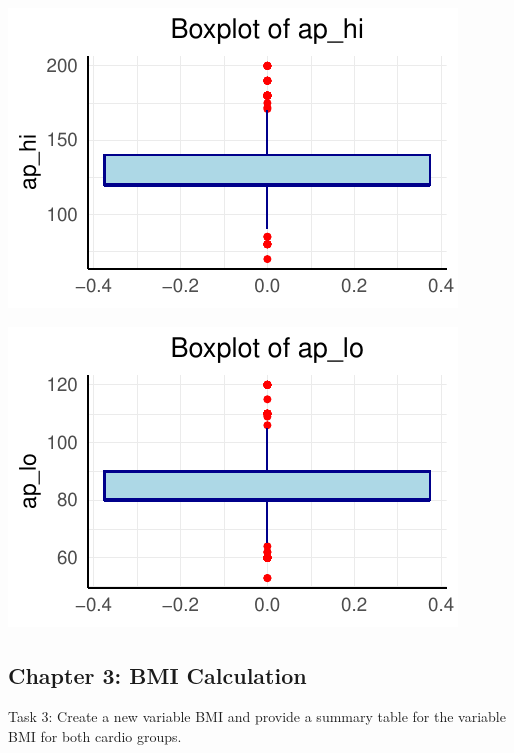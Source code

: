 \documentclass[
  letterpaper,
  DIV=11,
  numbers=noendperiod]{scrartcl}
\begin{document}
\begin{center}
\includegraphics{home_work_test_files/figure-pdf/unnamed-chunk-6-4.pdf}
\end{center}

\begin{center}
\includegraphics{home_work_test_files/figure-pdf/unnamed-chunk-6-5.pdf}
\end{center}

\newpage

\subsection{Chapter 3: BMI Calculation}\label{chapter-3-bmi-calculation}

Task 3: Create a new variable BMI and provide a summary table for the
variable BMI for both cardio groups.
\end{document}
